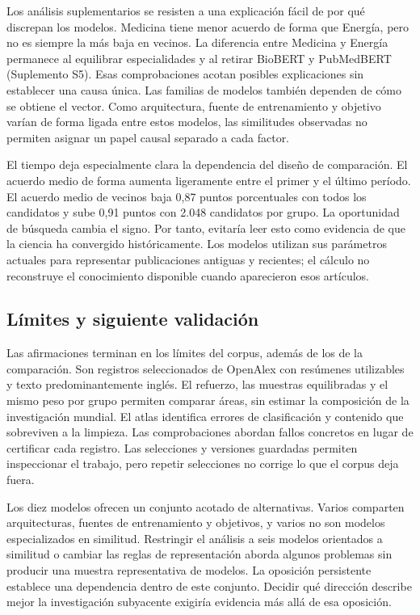 \documentclass[12pt]{article}
\begin{document}
Los análisis suplementarios se resisten a una explicación fácil de por qué discrepan los modelos. Medicina tiene menor acuerdo de forma que Energía, pero no es siempre la más baja en vecinos. La diferencia entre Medicina y Energía permanece al equilibrar especialidades y al retirar BioBERT y PubMedBERT (Suplemento S5). Esas comprobaciones acotan posibles explicaciones sin establecer una causa única. Las familias de modelos también dependen de cómo se obtiene el vector. Como arquitectura, fuente de entrenamiento y objetivo varían de forma ligada entre estos modelos, las similitudes observadas no permiten asignar un papel causal separado a cada factor.

El tiempo deja especialmente clara la dependencia del diseño de comparación. El acuerdo medio de forma aumenta ligeramente entre el primer y el último período. El acuerdo medio de vecinos baja 0,87 puntos porcentuales con todos los candidatos y sube 0,91 puntos con 2.048 candidatos por grupo. La oportunidad de búsqueda cambia el signo. Por tanto, evitaría leer esto como evidencia de que la ciencia ha convergido históricamente. Los modelos utilizan sus parámetros actuales para representar publicaciones antiguas y recientes; el cálculo no reconstruye el conocimiento disponible cuando aparecieron esos artículos.

\subsection{Límites y siguiente validación}
Las afirmaciones terminan en los límites del corpus, además de los de la comparación. Son registros seleccionados de OpenAlex con resúmenes utilizables y texto predominantemente inglés. El refuerzo, las muestras equilibradas y el mismo peso por grupo permiten comparar áreas, sin estimar la composición de la investigación mundial. El atlas identifica errores de clasificación y contenido que sobreviven a la limpieza. Las comprobaciones abordan fallos concretos en lugar de certificar cada registro. Las selecciones y versiones guardadas permiten inspeccionar el trabajo, pero repetir selecciones no corrige lo que el corpus deja fuera.

Los diez modelos ofrecen un conjunto acotado de alternativas. Varios comparten arquitecturas, fuentes de entrenamiento y objetivos, y varios no son modelos especializados en similitud. Restringir el análisis a seis modelos orientados a similitud o cambiar las reglas de representación aborda algunos problemas sin producir una muestra representativa de modelos. La oposición persistente establece una dependencia dentro de este conjunto. Decidir qué dirección describe mejor la investigación subyacente exigiría evidencia más allá de esa oposición.
\end{document}
